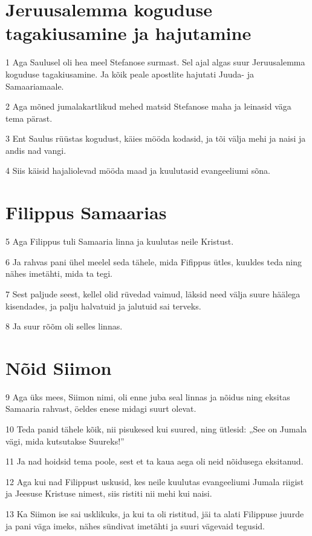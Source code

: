 \section*{Jeruusalemma koguduse tagakiusamine ja hajutamine}

\par 1 Aga Saulusel oli hea meel Stefanose surmast. Sel ajal algas suur Jeruusalemma koguduse tagakiusamine. Ja kõik peale apostlite hajutati Juuda- ja Samaariamaale.
\par 2 Aga mõned jumalakartlikud mehed matsid Stefanose maha ja leinasid väga tema pärast.
\par 3 Ent Saulus rüüstas kogudust, käies mööda kodasid, ja tõi välja mehi ja naisi ja andis nad vangi.
\par 4 Siis käisid hajaliolevad mööda maad ja kuulutasid evangeeliumi sõna.

\section*{Filippus Samaarias}

\par 5 Aga Filippus tuli Samaaria linna ja kuulutas neile Kristust.
\par 6 Ja rahvas pani ühel meelel seda tähele, mida Fifippus ütles, kuuldes teda ning nähes imetähti, mida ta tegi.
\par 7 Sest paljude seest, kellel olid rüvedad vaimud, läksid need välja suure häälega kisendades, ja palju halvatuid ja jalutuid sai terveks.
\par 8 Ja suur rõõm oli selles linnas.

\section*{Nõid Siimon}

\par 9 Aga üks mees, Siimon nimi, oli enne juba seal linnas ja nõidus ning eksitas Samaaria rahvast, öeldes enese midagi suurt olevat.
\par 10 Teda panid tähele kõik, nii pisukesed kui suured, ning ütlesid: „See on Jumala vägi, mida kutsutakse Suureks!”
\par 11 Ja nad hoidsid tema poole, sest et ta kaua aega oli neid nõidusega eksitanud.
\par 12 Aga kui nad Filippust uskusid, kes neile kuulutas evangeeliumi Jumala riigist ja Jeesuse Kristuse nimest, siis ristiti nii mehi kui naisi.
\par 13 Ka Siimon ise sai usklikuks, ja kui ta oli ristitud, jäi ta alati Filippuse juurde ja pani väga imeks, nähes sündivat imetähti ja suuri vägevaid tegusid.


